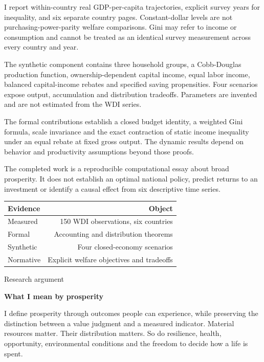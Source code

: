 \documentclass[10pt]{article}
\begin{document}
I report within-country real GDP-per-capita trajectories, explicit survey years for inequality, and six separate country pages. Constant-dollar levels are not purchasing-power-parity welfare comparisons. Gini may refer to income or consumption and cannot be treated as an identical survey measurement across every country and year.\par
The synthetic component contains three household groups, a Cobb-Douglas production function, ownership-dependent capital income, equal labor income, balanced capital-income rebates and specified saving propensities. Four scenarios expose output, accumulation and distribution tradeoffs. Parameters are invented and are not estimated from the WDI series.\par
The formal contributions establish a closed budget identity, a weighted Gini formula, scale invariance and the exact contraction of static income inequality under an equal rebate at fixed gross output. The dynamic results depend on behavior and productivity assumptions beyond those proofs.\par
The completed work is a reproducible computational essay about broad prosperity. It does not establish an optimal national policy, predict returns to an investment or identify a causal effect from six descriptive time series.\par
{\small\begin{tabularx}{\linewidth}{Xr}\toprule
Evidence & Object\\\midrule
Measured & 150 WDI observations, six countries\\
Formal & Accounting and distribution theorems\\
Synthetic & Four closed-economy scenarios\\
Normative & Explicit welfare objectives and tradeoffs\\
\bottomrule\end{tabularx}}\par
\clearpage
{\small\color{accent}Research argument}\par
{\LARGE\bfseries\color{ink}What I mean by prosperity}\par\vspace{7pt}
I define prosperity through outcomes people can experience, while preserving the distinction between a value judgment and a measured indicator. Material resources matter. Their distribution matters. So do resilience, health, opportunity, environmental conditions and the freedom to decide how a life is spent.\par
\end{document}
